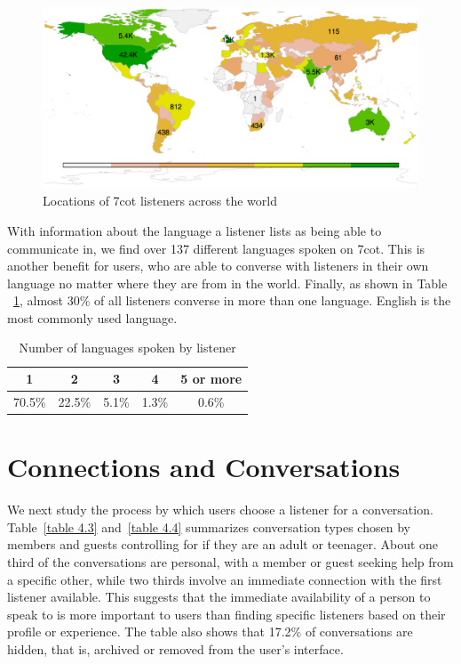 \begin{figure}
	\centering %
	\includegraphics[width=5in]{countries.png} %
	\caption{Locations of 7cot listeners across the world} 
	\label{fig2}
\end{figure}

With information about the language a listener lists as being able to communicate in, we find over 137 different languages spoken on 7cot. This is another benefit for users, who are able to converse with listeners in their own language no matter where they are from in the world. Finally, as shown in Table ~\ref{table 4.2}, almost 30\% of all listeners converse in more than one language. English is the most commonly used language. 

\begin{table}
	\centering
	\begin{tabular}{c c c c c} 
		1 & 2 & 3 & 4 & 5 or more \\ 
		\hline
		70.5\% & 22.5\% & 5.1\% & 1.3\% & 0.6\%    \\
	\end{tabular}
	\caption{Number of languages spoken by listener}
	\label{table 4.2}
\end{table}

\section{Connections and Conversations}

We next study the process by which users choose a listener for a conversation. 
Table~\ref{table 4.3} and~\ref{table 4.4} summarizes conversation types chosen by members and guests controlling for if they are an adult or teenager. About one third of the conversations are personal, with a member or guest seeking help from a specific other, while two thirds involve an immediate connection with the first listener available. This suggests that the immediate availability of a person to speak to is more important to users than finding specific listeners based on their profile or experience. The table also shows that 17.2\% of conversations are hidden, that is, archived or removed from the user's interface.


